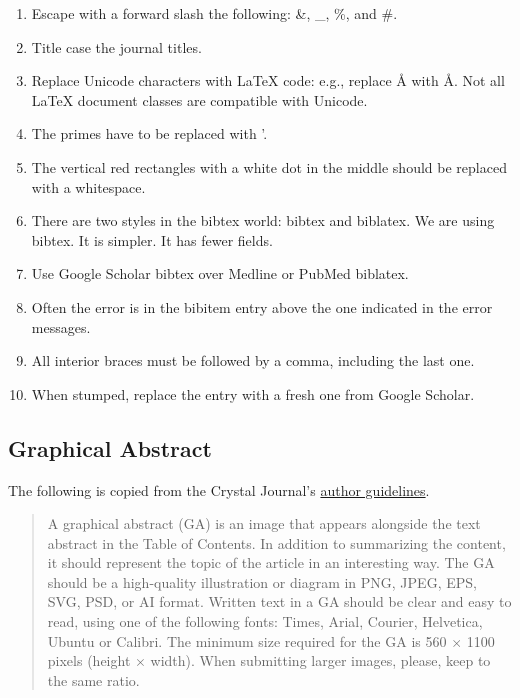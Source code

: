 \documentclass[10pt,letterpaper]{article}
\newcommand{\be}{\begin{enumerate}}
\newcommand{\ee}{\end{enumerate}}
\begin{document}
\begin{description}
\be
\item Escape with a forward slash the following: \&, \_, \%, and \#. 
\item Title case the journal titles.
\item Replace Unicode characters with LaTeX code: e.g., replace Å with \AA. Not all LaTeX document classes are compatible with Unicode.
\item The primes have to be replaced with '.
\item The vertical red rectangles with a white dot in the middle should be replaced with a whitespace.
\item There are two styles in the bibtex world: bibtex and biblatex. We are using bibtex. It is simpler. It has fewer fields.
\item Use Google Scholar bibtex over Medline or PubMed biblatex. 
\item Often the error is in the bibitem entry above the one indicated in the error messages.
\item All interior braces must be followed by a comma, including the last one.
\item When stumped, replace the entry with a fresh one from Google Scholar.
\ee



\subsection{Graphical Abstract}
\label{subsec:guides:graphicalAbstract}


The following is copied from the Crystal Journal's \href{https://www.mdpi.com/journal/crystals/instructions#preparation}{author guidelines}.

\begin{quote}
A graphical abstract (GA) is an image that appears alongside the text abstract in the Table of Contents. 
In addition to summarizing the content, it should represent the topic of the article in an interesting way.
The GA should be a high-quality illustration or diagram in PNG, JPEG, EPS, SVG, PSD, or AI format. 
Written text in a GA should be clear and easy to read, using one of the following fonts: Times, Arial, Courier, Helvetica, Ubuntu or Calibri.
The minimum size required for the GA is 560 $\times$ 1100 pixels (height $\times$ width). 
When submitting larger images, please, keep to the same ratio.
\end{quote}






\end{description}
\end{document}
